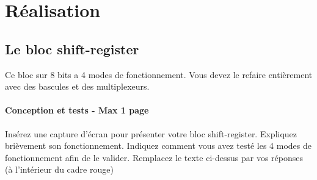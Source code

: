 \documentclass[a4paper]{article} %
\begin{document}
\section {Réalisation}
\subsection{Le bloc shift-register}
Ce bloc sur 8 bits a 4 modes de fonctionnement. Vous devez le refaire entièrement avec des bascules et des multiplexeurs.
\begin{tcolorbox}[colframe=Monokaimagenta,colback=white]
\paragraph{Conception et tests - Max 1 page}
Insérez une capture d’écran pour présenter votre bloc shift-register. Expliquez brièvement son fonctionnement.
Indiquez comment vous avez testé les 4 modes de fonctionnement afin de le valider.
Remplacez le texte ci-dessus par vos réponses (à l’intérieur du cadre rouge)
\\
\end{tcolorbox}
\end{document}

